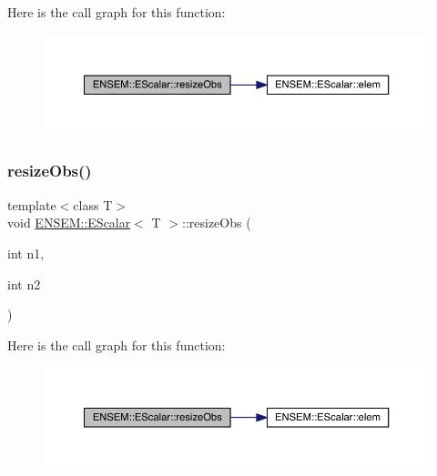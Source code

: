Here is the call graph for this function\+:
\nopagebreak
\begin{figure}[H]
\begin{center}
\leavevmode
\includegraphics[width=350pt]{d0/d82/classENSEM_1_1EScalar_af9faf602be10ce072be3fc532a7e17fe_cgraph}
\end{center}
\end{figure}
\mbox{\label{classENSEM_1_1EScalar_ad4fe54c2fb8a3420e1e452228d8d40b1}} 
\subsubsection{\texorpdfstring{resizeObs()}{resizeObs()}\hspace{0.1cm}{\footnotesize\ttfamily [4/12]}}
{\footnotesize\ttfamily template$<$class T$>$ \\
void \mbox{\hyperlink{classENSEM_1_1EScalar}{E\+N\+S\+E\+M\+::\+E\+Scalar}}$<$ T $>$\+::resize\+Obs (\begin{DoxyParamCaption}\item[{int}]{n1,  }\item[{int}]{n2 }\end{DoxyParamCaption})\hspace{0.3cm}{\ttfamily [inline]}}

Here is the call graph for this function\+:
\nopagebreak
\begin{figure}[H]
\begin{center}
\leavevmode
\includegraphics[width=350pt]{d0/d82/classENSEM_1_1EScalar_ad4fe54c2fb8a3420e1e452228d8d40b1_cgraph}
\end{center}
\end{figure}
\mbox{\label{classENSEM_1_1EScalar_ad4fe54c2fb8a3420e1e452228d8d40b1}} 
